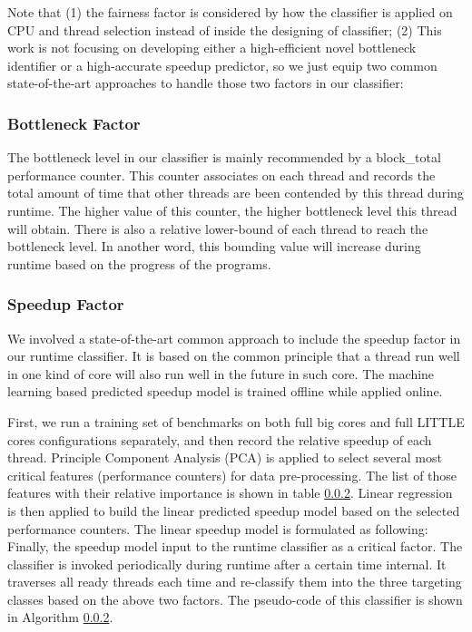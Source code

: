 \documentclass[pageno]{jpaper}
\begin{document}
Note that (1) the fairness factor is considered by how the classifier is applied on CPU and thread selection instead of inside the designing of classifier; (2) This work is not focusing on developing either a high-efficient novel bottleneck identifier or a high-accurate speedup predictor, so we just equip two common state-of-the-art approaches to handle those two factors in our classifier: 

\subsubsection{Bottleneck Factor}
The bottleneck level in our classifier is mainly recommended by a block\_total performance counter. This counter associates on each thread and records the total amount of time that other threads are been contended by this thread during runtime. The higher value of this counter, the higher bottleneck level this thread will obtain. There is also a relative lower-bound of each thread to reach the bottleneck level. In another word, this bounding value will increase during runtime based on the progress of the programs. 


\subsubsection{Speedup Factor}
We involved a state-of-the-art common approach to include the speedup factor in our runtime classifier. It is based on the common principle that a thread run well in one kind of core will also run well in the future in such core. The machine learning based predicted speedup model is trained offline while applied online. 

First, we run a training set of benchmarks on both full big cores and full LITTLE cores configurations separately, and then record the relative speedup of each thread. Principle Component Analysis (PCA) is applied to select several most critical features (performance counters) for data pre-processing. The list of those features with their relative importance is shown in table \ref{}. Linear regression is then applied to build the linear predicted speedup model based on the selected performance counters. The linear speedup model is formulated as following:
$$ $$
Finally, the speedup model input to the runtime classifier as a critical factor. The classifier is invoked periodically during runtime after a certain time internal. It traverses all ready threads each time and re-classify them into the three targeting classes based on the above two factors. The pseudo-code of this classifier is shown in Algorithm \ref{}. 
\end{document}
